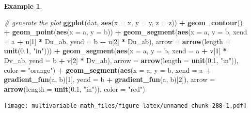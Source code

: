 \documentclass[
]{book}
\newenvironment{Shaded}{\begin{snugshade}}{\end{snugshade}}
\newcommand{\CommentTok}[1]{\textcolor[rgb]{0.56,0.35,0.01}{\textit{#1}}}
\newcommand{\DataTypeTok}[1]{\textcolor[rgb]{0.13,0.29,0.53}{#1}}
\newcommand{\DecValTok}[1]{\textcolor[rgb]{0.00,0.00,0.81}{#1}}
\newcommand{\FloatTok}[1]{\textcolor[rgb]{0.00,0.00,0.81}{#1}}
\newcommand{\KeywordTok}[1]{\textcolor[rgb]{0.13,0.29,0.53}{\textbf{#1}}}
\newcommand{\NormalTok}[1]{#1}
\newcommand{\OperatorTok}[1]{\textcolor[rgb]{0.81,0.36,0.00}{\textbf{#1}}}
\newcommand{\StringTok}[1]{\textcolor[rgb]{0.31,0.60,0.02}{#1}}
\theoremstyle{definition}
\theoremstyle{definition}
\newtheorem{example}{Example}[chapter]
\theoremstyle{definition}
\theoremstyle{remark}
\begin{document}
\begin{example}
\begin{Shaded}
\begin{Highlighting}[]
\CommentTok{# generate the plot}
\KeywordTok{ggplot}\NormalTok{(dat, }\KeywordTok{aes}\NormalTok{(}\DataTypeTok{x =}\NormalTok{ x, }\DataTypeTok{y =}\NormalTok{ y, }\DataTypeTok{z =}\NormalTok{ z)) }\OperatorTok{+}
\StringTok{        }\KeywordTok{geom_contour}\NormalTok{() }\OperatorTok{+}\StringTok{ }
\StringTok{        }\KeywordTok{geom_point}\NormalTok{(}\KeywordTok{aes}\NormalTok{(}\DataTypeTok{x =}\NormalTok{ a, }\DataTypeTok{y =}\NormalTok{ b)) }\OperatorTok{+}
\StringTok{        }\KeywordTok{geom_segment}\NormalTok{(}\KeywordTok{aes}\NormalTok{(}\DataTypeTok{x =}\NormalTok{ a, }\DataTypeTok{y =}\NormalTok{ b, }\DataTypeTok{xend =}\NormalTok{ a }\OperatorTok{+}\StringTok{ }\NormalTok{u[}\DecValTok{1}\NormalTok{] }\OperatorTok{*}\StringTok{ }\NormalTok{Du_ab, }\DataTypeTok{yend =}\NormalTok{ b }\OperatorTok{+}\StringTok{ }\NormalTok{u[}\DecValTok{2}\NormalTok{] }\OperatorTok{*}\StringTok{ }\NormalTok{Du_ab), }
                     \DataTypeTok{arrow =} \KeywordTok{arrow}\NormalTok{(}\DataTypeTok{length =} \KeywordTok{unit}\NormalTok{(}\FloatTok{0.1}\NormalTok{, }\StringTok{"in"}\NormalTok{))) }\OperatorTok{+}
\StringTok{        }\KeywordTok{geom_segment}\NormalTok{(}\KeywordTok{aes}\NormalTok{(}\DataTypeTok{x =}\NormalTok{ a, }\DataTypeTok{y =}\NormalTok{ b, }\DataTypeTok{xend =}\NormalTok{ a }\OperatorTok{+}\StringTok{ }\NormalTok{v[}\DecValTok{1}\NormalTok{] }\OperatorTok{*}\StringTok{ }\NormalTok{Dv_ab, }\DataTypeTok{yend =}\NormalTok{ b }\OperatorTok{+}\StringTok{ }\NormalTok{v[}\DecValTok{2}\NormalTok{] }\OperatorTok{*}\StringTok{ }\NormalTok{Dv_ab), }
                     \DataTypeTok{arrow =} \KeywordTok{arrow}\NormalTok{(}\DataTypeTok{length =} \KeywordTok{unit}\NormalTok{(}\FloatTok{0.1}\NormalTok{, }\StringTok{"in"}\NormalTok{)), }\DataTypeTok{color =} \StringTok{"orange"}\NormalTok{) }\OperatorTok{+}
\StringTok{        }\KeywordTok{geom_segment}\NormalTok{(}\KeywordTok{aes}\NormalTok{(}\DataTypeTok{x =}\NormalTok{ a, }\DataTypeTok{y =}\NormalTok{ b, }\DataTypeTok{xend =}\NormalTok{ a }\OperatorTok{+}\StringTok{ }\KeywordTok{gradient_fun}\NormalTok{(a, b)[}\DecValTok{1}\NormalTok{], }\DataTypeTok{yend =}\NormalTok{ b }\OperatorTok{+}\StringTok{ }\KeywordTok{gradient_fun}\NormalTok{(a, b)[}\DecValTok{2}\NormalTok{]), }
                     \DataTypeTok{arrow =} \KeywordTok{arrow}\NormalTok{(}\DataTypeTok{length =} \KeywordTok{unit}\NormalTok{(}\FloatTok{0.1}\NormalTok{, }\StringTok{"in"}\NormalTok{)), }\DataTypeTok{color =} \StringTok{"red"}\NormalTok{) }
\end{Highlighting}
\end{Shaded}

\texttt{[image: multivariable-math\_files/figure-latex/unnamed-chunk-288-1.pdf]}

\end{example}
\end{document}
